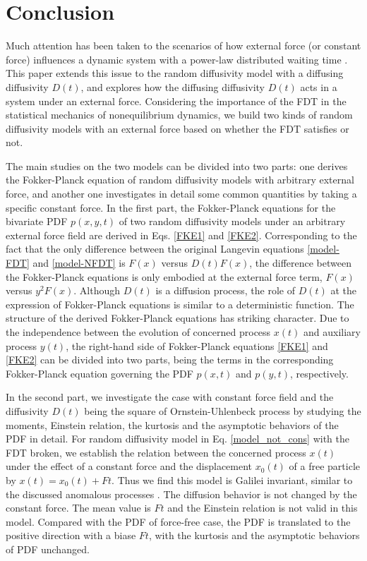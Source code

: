 \documentclass[aps,pre,twocolumn,groupedaddress,longbibliography]{revtex4-2}
\begin{document}
\section{Conclusion}\label{Sec7}
Much attention has been taken to the scenarios of how external force (or constant force) influences a dynamic system with a power-law distributed waiting time \cite{BarkaiFleurov:1998,MetzlerKlafter:2000,FroembergBarkai:2013-3,ChenWangDeng:2019-2,ChenWangDeng:2019-3}.
This paper extends this issue to the random diffusivity model with a diffusing diffusivity $D(t)$, and explores how the diffusing diffusivity $D(t)$ acts in a system under an external force.
Considering the importance of the FDT in the statistical mechanics of nonequilibrium dynamics, we build two kinds of random diffusivity models with an external force based on whether the FDT satisfies or not.

The main studies on the two models can be divided into two parts: one derives the Fokker-Planck equation of random diffusivity models with arbitrary external force, and another one investigates in detail some common quantities by taking a specific constant force.
In the first part, the Fokker-Planck equations for the bivariate PDF $p(x,y,t)$ of
two random diffusivity models under an arbitrary external force field are derived in Eqs. \eqref{FKE1} and \eqref{FKE2}. Corresponding to the fact that the only difference between the original Langevin equations \eqref{model-FDT} and \eqref{model-NFDT} is $F(x)$ versus $D(t)F(x)$, the difference between the Fokker-Planck equations is only embodied at the external force term, $F(x)$ versus $y^2F(x)$. Although $D(t)$ is a diffusion process, the role of $D(t)$ at the expression of Fokker-Planck equations is similar to a deterministic function.
The structure of the derived Fokker-Planck equations has striking character. Due to the independence between the evolution of concerned process $x(t)$ and auxiliary process $y(t)$, the right-hand side of Fokker-Planck equations \eqref{FKE1} and \eqref{FKE2} can be divided into two parts, being the terms in the corresponding Fokker-Planck equation governing the PDF $p(x,t)$ and $p(y,t)$, respectively.

In the second part, we investigate the case with constant force field and the diffusivity $D(t)$ being
the square of Ornstein-Uhlenbeck process by studying the moments, Einstein relation, the kurtosis and the asymptotic behaviors of the PDF in detail.
For random diffusivity model in Eq. \eqref{model_not_cons} with the FDT broken, we establish the relation between the concerned process $x(t)$ under the effect of a constant force and the displacement $x_0(t)$ of a free particle by $x(t)=x_0(t) +Ft$. Thus we find this model is Galilei invariant, similar to the discussed anomalous processes \cite{MetzlerKlafter:2000,CairoliKlagesBaule:2018,ChenWangDeng:2019-2}. The diffusion behavior is not changed by the constant force. The mean value is $Ft$ and the Einstein relation is not valid in this model. Compared with the PDF of force-free case, the PDF is translated to the positive direction with a biase $Ft$, with the kurtosis and the asymptotic behaviors of PDF unchanged.
\end{document}
